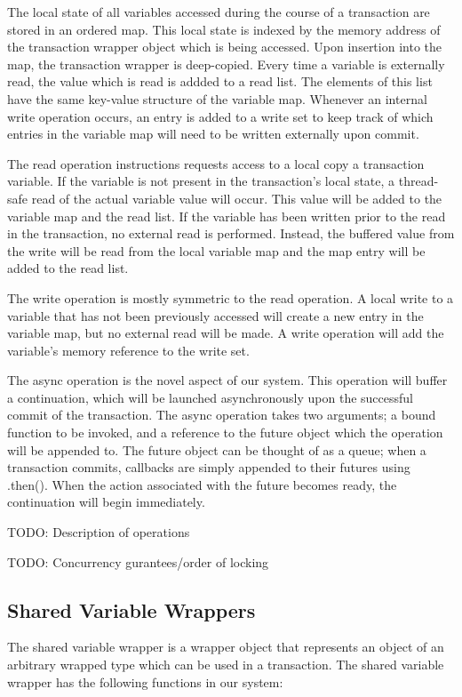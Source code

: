 \documentclass[conference]{IEEEtran}
\begin{document}
The local state of all variables accessed during the course of a transaction
are stored in an ordered map. This local state is indexed by the memory address
of the transaction wrapper object which is being accessed. Upon insertion into
the map, the transaction wrapper is deep-copied. Every time a variable is
externally read, the value which is read is addded to a read list. The elements
of this list have the same key-value structure of the variable map. Whenever an
internal write operation occurs, an entry is added to a write set to keep track
of which entries in the variable map will need to be written externally upon
commit.

The read operation instructions requests access to a local copy a transaction
variable. If the variable is not present in the transaction's local state, a
thread-safe read of the actual variable value will occur. This value will be
added to the variable map and the read list. If the variable has been written
prior to the read in the transaction, no external read is performed. Instead,
the buffered value from the write will be read from the local variable map
and the map entry will be added to the read list.

The write operation is mostly symmetric to the read operation. A local write to
a variable that has not been previously accessed will create a new entry in the
variable map, but no external read will be made. A write operation will add the
variable's memory reference to the write set.

The async operation is the novel aspect of our system. This operation will
buffer a continuation, which will be launched asynchronously upon the
successful commit of the transaction. The async operation takes two
arguments; a bound function to be invoked, and a reference to the future
object which the operation will be appended to. The future object can be
thought of as a queue; when a transaction commits, callbacks are simply
appended to their futures using .then(). When the action associated with the
future becomes ready, the continuation will begin immediately.

TODO: Description of operations

TODO: Concurrency gurantees/order of locking

\subsection{Shared Variable Wrappers}

The shared variable wrapper is a wrapper object that represents an object of an
arbitrary wrapped type which can be used in a transaction. The shared variable
wrapper has the following functions in our system:
\end{document}
